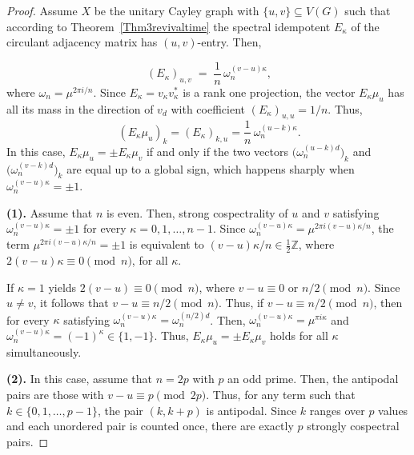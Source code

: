 \documentclass[12pt]{amsart}
\begin{document}
\begin{proof}
Assume $X$ be the unitary Cayley graph  with $\{u,v\}\subseteq V(G)$ such that according to Theorem~\ref{Thm3revivaltime} the spectral idempotent $E_{\kappa}$ of the circulant adjacency  matrix has $(u,v)$-entry. Then, 

  \begin{equation}~\label{eqq1Thm4cospectral}
    (E_{\kappa})_{u,v} \;=\; \frac{1}{n}\,\omega_n^{(v-u)\kappa},
  \end{equation}
  where $\omega_n = \mu^{2\pi i/n}.$ Since $E_{\kappa} = v_{\kappa} v_{\kappa}^*$ is a rank one projection, the vector $E_{\kappa} \mu_u$ has all its mass
  in the direction of $v_d$ with coefficient $(E_{\kappa})_{u,u} = 1/n$. Thus,
\begin{equation}~\label{eqq2Thm4cospectral}
 (E_{\kappa} \mu_u)_k = (E_{\kappa})_{k,u} = \frac{1}{n}\,\omega_n^{(u-k)\kappa}.
\end{equation}
In this case,  $E_{\kappa} \mu_u = \pm E_{\kappa} \mu_v$ if and only if the two vectors
  $\bigl(\omega_n^{(u-k)d}\bigr)_{k}$ and $\bigl(\omega_n^{(v-k)d}\bigr)_{k}$ are equal up
  to a global sign, which happens sharply when $\omega_n^{(v-u)\kappa} = \pm 1$.

\medskip
  
\noindent \textbf{(1).} Assume that $n$ is even. Then, strong cospectrality of $u$ and
  $v$ satisfying $\omega_n^{(v-u)\kappa} = \pm 1$ for every $\kappa=0, 1, \ldots, n-1$.
  Since $\omega_n^{(v-u)\kappa} = \mu^{2\pi i (v-u)\kappa/n}$, the term $\mu^{2\pi i (v-u)\kappa/n}=\pm 1$
  is equivalent to $(v-u)\kappa/n \in \frac{1}{2}\mathbb{Z}$, where $2(v-u)\kappa \equiv 0 \pmod{n}$,
  for all $\kappa$.
  
  If $\kappa=1$ yields $2(v-u) \equiv 0 \pmod{n}$, where $v-u\equiv 0$ or
  $n/2 \pmod{n}$. Since $u \neq v$, it follows that $v-u \equiv n/2 \pmod{n}$. Thus, if $v-u \equiv n/2 \pmod{n}$, then for every $\kappa$ satisfying $ \omega_n^{(v-u)\kappa} = \omega_n^{(n/2)d}$. Then, $ \omega_n^{(v-u)\kappa} =\mu^{\pi i \kappa}$ and $ \omega_n^{(v-u)\kappa}=(-1)^\kappa \in \{1,-1\}.$ Thus,  $E_{\kappa} \mu_u = \pm E_{\kappa} \mu_v$ holds for all $\kappa$ simultaneously. 

  \medskip
  
\noindent \textbf{(2).} In this case, assume that $n=2p$ with $p$ an odd prime. Then,  the antipodal pairs
  are those with $v - u \equiv p \pmod{2p}$. Thus, for any term such that $k \in \{0,1,\ldots,p-1\}$,
  the pair $(k, k+p)$ is antipodal. 
  Since $k$ ranges over $p$ values and each unordered pair
  is counted once, there are exactly $p$ strongly cospectral pairs. 
  



\end{proof}
\end{document}
